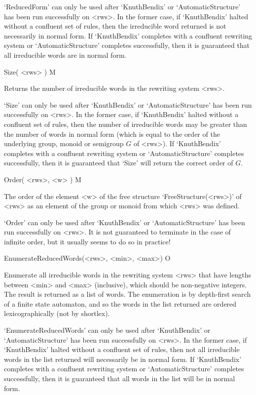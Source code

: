 `ReducedForm' can only be used after `KnuthBendix' or `AutomaticStructure'
has been run
successfully on <rws>.  In the former case, if  `KnuthBendix' halted without  a
confluent  set of  rules, then the   irreducible word returned is  not
necessarily in  normal   form.  If `KnuthBendix'  completes   with  a confluent
rewriting  system or  `AutomaticStructure'  completes  successfully, then it  is
guaranteed that all irreducible words are in normal form.


\>Size( <rws> ) M

Returns the number of irreducible words in the rewriting system <rws>.

`Size'   can only be  used  after `KnuthBendix'  or
`AutomaticStructure' has been run
successfully  on <rws>. In  the former case, if  `KnuthBendix' halted without a
confluent  set of rules, then the  number of  irreducible words may be
greater than the number of words in normal form (which is equal to the
order  of the underlying group, monoid or semigroup $G$  of  <rws>).  If
`KnuthBendix'  completes with a confluent rewriting system  or
`AutomaticStructure' completes successfully, then it is  guaranteed that
`Size' will  return the correct order of $G$.

\medskip
\>Order( <rws>, <w> ) M

The order  of the element <w> of the free structure `FreeStructure(<rws>)' of
<rws> as an element of the group or monoid from which <rws> was defined.

`Order'   can only be  used  after `KnuthBendix'  or
`AutomaticStructure' has been run successfully  on <rws>.
It is not guaranteed to terminate in the case of infinite order, but it
usually seems to do so in practice!

\medskip
\>EnumerateReducedWords(<rws>, <min>, <max>) O

Enumerate  all  irreducible words in  the  rewriting system <rws> that
have   lengths between <min> and <max>    (inclusive), which should be
non-negative integers.    The result is returned  as  a list of words.
The enumeration is by depth-first search  of a finite state automaton,
and so  the words in the  list returned  are ordered lexicographically
(not by shortlex).

`EnumerateReducedWords' can only be used after `KnuthBendix'
or `AutomaticStructure' has been run
successfully on <rws>. In  the former case,  if `KnuthBendix' halted  without a
confluent set of  rules, then not all irreducible   words in the  list
returned will necessarily be in normal form.  If `KnuthBendix' completes with a
confluent rewriting  system or `AutomaticStructure' completes successfully, then
it is guaranteed that all words in the list will be in normal form.

